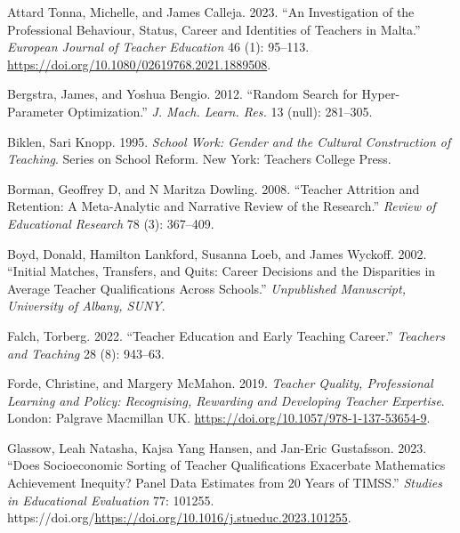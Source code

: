 \documentclass[
]{article}
\newlength{\cslhangindent}
\newlength{\cslentryspacingunit} %
\newenvironment{CSLReferences}[2] %
 {%
  \setlength{\parindent}{0pt}
  \ifodd #1
  \let\oldpar\par
  \def\par{\hangindent=\cslhangindent\oldpar}
  \fi
  \setlength{\parskip}{#2\cslentryspacingunit}
 }%
 {}
\begin{document}
\hypertarget{refs}{}
\begin{CSLReferences}{1}{0}
\leavevmode{}%
Attard Tonna, Michelle, and James Calleja. 2023. {``An Investigation of the Professional Behaviour, Status, Career and Identities of Teachers in Malta.''} \emph{European Journal of Teacher Education} 46 (1): 95--113. \url{https://doi.org/10.1080/02619768.2021.1889508}.

\leavevmode{}%
Bergstra, James, and Yoshua Bengio. 2012. {``Random Search for Hyper-Parameter Optimization.''} \emph{J. Mach. Learn. Res.} 13 (null): 281--305.

\leavevmode{}%
Biklen, Sari Knopp. 1995. \emph{School Work: Gender and the Cultural Construction of Teaching}. Series on School Reform. New York: Teachers College Press.

\leavevmode{}%
Borman, Geoffrey D, and N Maritza Dowling. 2008. {``Teacher Attrition and Retention: A Meta-Analytic and Narrative Review of the Research.''} \emph{Review of Educational Research} 78 (3): 367--409.

\leavevmode{}%
Boyd, Donald, Hamilton Lankford, Susanna Loeb, and James Wyckoff. 2002. {``Initial Matches, Transfers, and Quits: Career Decisions and the Disparities in Average Teacher Qualifications Across Schools.''} \emph{Unpublished Manuscript, University of Albany, SUNY}.

\leavevmode{}%
Falch, Torberg. 2022. {``Teacher Education and Early Teaching Career.''} \emph{Teachers and Teaching} 28 (8): 943--63.

\leavevmode{}%
Forde, Christine, and Margery McMahon. 2019. \emph{Teacher Quality, Professional Learning and Policy: Recognising, Rewarding and Developing Teacher Expertise}. London: Palgrave Macmillan UK. \url{https://doi.org/10.1057/978-1-137-53654-9}.

\leavevmode{}%
Glassow, Leah Natasha, Kajsa Yang Hansen, and Jan-Eric Gustafsson. 2023. {``Does Socioeconomic Sorting of Teacher Qualifications Exacerbate Mathematics Achievement Inequity? Panel Data Estimates from 20 Years of TIMSS.''} \emph{Studies in Educational Evaluation} 77: 101255. https://doi.org/\url{https://doi.org/10.1016/j.stueduc.2023.101255}.


\end{CSLReferences}
\end{document}
